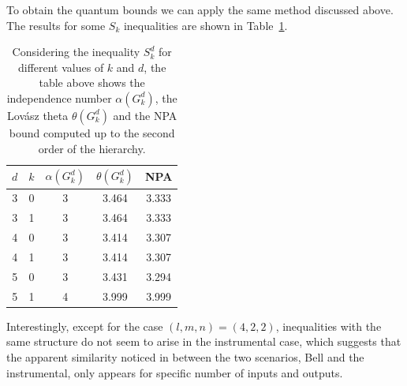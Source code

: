 \documentclass[letterpaper]{article}
\begin{document}
To obtain the quantum bounds we can apply the same method discussed above.
The results for some $S_k$ inequalities are shown in Table~\ref{tab:gclmps}.
\begin{table}
    \centering
    \begin{tabular}{ccccc}
        $d$ & $k$ & $\alpha(G^d_k)$ & $\theta(G^d_k)$ & NPA \\
        \toprule
         3 & 0 & 3 & 3.464 & 3.333 \\
         3 & 1 & 3 & 3.464 & 3.333 \\
        \midrule
         4 & 0 & 3 & 3.414 & 3.307 \\
         4 & 1 & 3 & 3.414 & 3.307 \\
        \midrule
         5 & 0 & 3 & 3.431 & 3.294 \\
         5 & 1 & 4 & 3.999 & 3.999 \\
        \bottomrule
    \end{tabular}
    \caption{Considering the inequality $S^d_k$ for different values of $k$ and $d$, the table above shows the independence number $\alpha(G^d_k)$, the Lov\'asz theta $\theta(G^d_k)$ and the NPA bound computed up to the second order of the hierarchy.}
    \label{tab:gclmps}
\end{table}

Interestingly, except for the case $(l,m,n) = (4,2,2)$, inequalities with the
same structure do not seem to arise in the instrumental case, which suggests
that the apparent similarity noticed in \cite{himbeeck2018} between the two scenarios, Bell and the
instrumental, only appears for specific number of inputs and outputs. 
\end{document}
